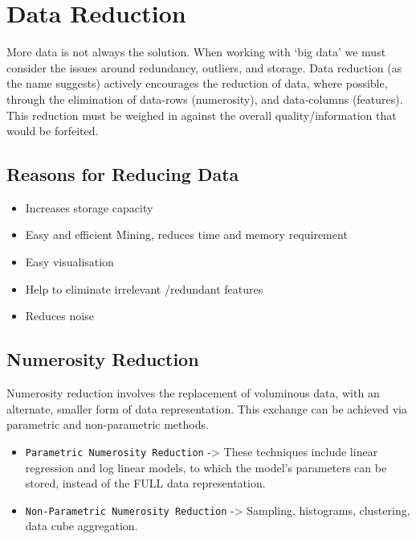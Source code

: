 \documentclass[11pt]{article}
\providecommand{\tightlist}{%
      \setlength{\itemsep}{0pt}\setlength{\parskip}{0pt}}
\begin{document}
    \hypertarget{data-reduction}{%
\section{Data Reduction}\label{data-reduction}}

More data is not always the solution. When working with `big data' we
must consider the issues around redundancy, outliers, and storage. Data
reduction (as the name suggests) actively encourages the reduction of
data, where possible, through the elimination of data-rows (numerosity),
and data-columns (features). This reduction must be weighed in against
the overall quality/information that would be forfeited.

\hypertarget{reasons-for-reducing-data}{%
\subsection{Reasons for Reducing Data}\label{reasons-for-reducing-data}}

\begin{itemize}
\tightlist
\item
  Increases storage capacity
\item
  Easy and efficient Mining, reduces time and memory requirement
\item
  Easy visualisation
\item
  Help to eliminate irrelevant /redundant features
\item
  Reduces noise
\end{itemize}

    \hypertarget{numerosity-reduction}{%
\subsection{Numerosity Reduction}\label{numerosity-reduction}}

Numerosity reduction involves the replacement of voluminous data, with
an alternate, smaller form of data representation. This exchange can be
achieved via parametric and non-parametric methods.

\begin{itemize}
\item
  \texttt{Parametric\ Numerosity\ Reduction} -\textgreater{} These
  techniques include linear regression and log linear models, to which
  the model's parameters can be stored, instead of the FULL data
  representation.
\item
  \texttt{Non-Parametric\ Numerosity\ Reduction} -\textgreater{}
  Sampling, histograms, clustering, data cube aggregation.
\end{itemize}
\end{document}
